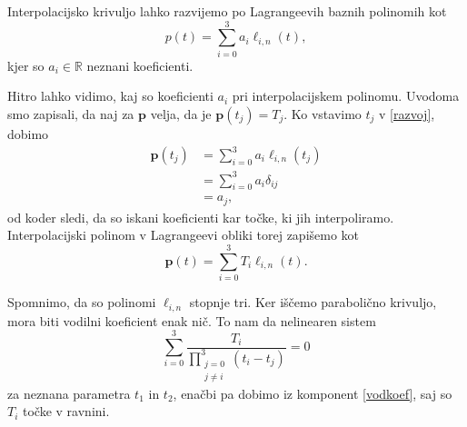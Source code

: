 \documentclass[mat1]{fmfdelo}
\newcommand{\R}{\mathbb R}
\begin{document}
Interpolacijsko krivuljo lahko razvijemo po Lagrangeevih baznih polinomih kot 
\begin{equation}\label{razvoj}
p(t) = \sum_{i=0}^{3} a_i \ell_{i,n}(t),
\end{equation}
%
kjer so $a_i \in \R$ neznani koeficienti.

Hitro lahko vidimo, kaj so koeficienti $a_i$ pri interpolacijskem polinomu. Uvodoma smo zapisali, da naj za $\textbf{p}$ velja, da je $\textbf{p}(t_j) = T_j$. Ko vstavimo $t_j$ v \eqref{razvoj}, dobimo
\begin{align*}
\textbf{p}(t_j) &=  \sum_{i=0}^{3} a_i \ell_{i,n}(t_j) \\
	 &= \sum_{i=0}^{3} a_i \delta_{ij} \\
	&= a_j
,\end{align*}
od koder sledi, da so iskani koeficienti kar točke, ki jih interpoliramo. Interpolacijski polinom v Lagrangeevi obliki torej zapišemo kot 
$$\textbf{p}(t) = \sum_{i=0}^{3} T_i \ell_{i,n}(t).$$

Spomnimo, da so polinomi $\ell_{i,n}$ stopnje tri. Ker iščemo parabolično krivuljo, mora biti vodilni koeficient enak nič. To nam da nelinearen sistem
\begin{equation}\label{vodkoef}
\sum_{i = 0}^{3} \frac{T_i}{\prod_{\substack{j = 0 \\ j \neq i}}^3(t_i - t_j)} = 0
\end{equation}
%
za neznana parametra $t_1$ in $t_2$, enačbi pa dobimo iz komponent \eqref{vodkoef}, saj so $T_i$ točke v ravnini.
%
%
\end{document}
